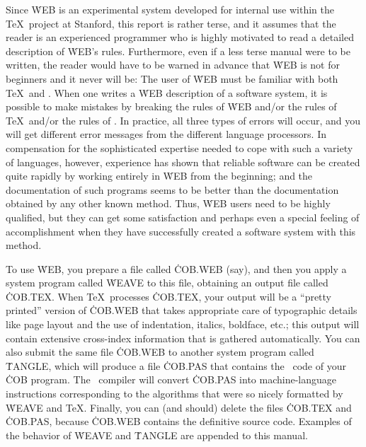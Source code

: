 Since \.{WEB} is an experimental system developed for internal use within
the \TeX\ project at Stanford, this report is rather terse, and it assumes
that the reader is an experienced programmer who is highly motivated to
read a detailed description of \.{WEB}'s rules. Furthermore, even if a
less terse manual were to be written, the reader would have to be warned
in advance that \.{WEB} is not for beginners and it never will be: The
user of \.{WEB} must be familiar with both \TeX\ and \PASCAL. When one
writes a \.{WEB} description of a software system, it is possible to make
mistakes by breaking the rules of \.{WEB} and/or the rules of \TeX\ and/or
the rules of \PASCAL. In practice, all three types of errors will occur,
and you will get different error messages from the different language
processors. In compensation for the sophisticated expertise needed to cope
with such a variety of languages, however, experience has shown that
reliable software can be created quite rapidly by working entirely in
\.{WEB} from the beginning; and the documentation of such programs seems
to be better than the documentation obtained by any other known method.
Thus, \.{WEB} users need to be highly qualified, but they can get some
satisfaction and perhaps even a special feeling of accomplishment when
they have successfully created a software system with this method.

To use \.{WEB}, you prepare a file called \.{COB.WEB} (say), and then you
apply a system program called \.{WEAVE} to this file, obtaining an output
file called \.{COB.TEX}.  When \TeX\ processes \.{COB.TEX}, your output
will be a ``pretty printed'' version of \.{COB.WEB} that takes appropriate
care of typographic details like page layout and the use of indentation,
italics, boldface, etc.; this output will contain extensive cross-index
information that is gathered automatically. You can also submit the same
file \.{COB.WEB} to another system program called \.{TANGLE}, which will
produce a file \.{COB.PAS} that contains the \PASCAL\ code of your \.{COB}
program. The \PASCAL\ compiler will convert \.{COB.PAS} into
machine-language instructions corresponding to the algorithms that were so
nicely formatted by \.{WEAVE} and \TeX. Finally, you can (and should)
delete the files \.{COB.TEX} and \.{COB.PAS}, because \.{COB.WEB} contains
the definitive source code. Examples of the behavior of \.{WEAVE} and
\.{TANGLE} are appended to this manual.

